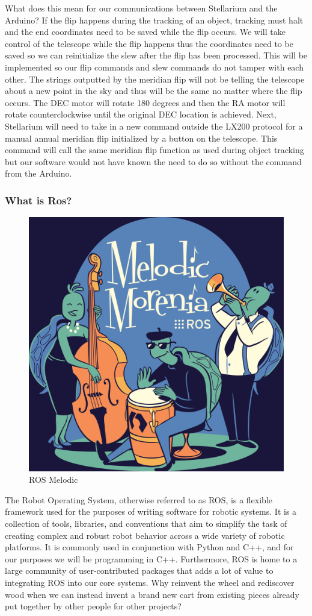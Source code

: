 \documentclass[12pt]{report}
\begin{document}
What does this mean for our communications between Stellarium and the Arduino? If the flip happens during the tracking of an object, tracking must halt and the end coordinates need to be saved while the flip occurs. We will take control of the telescope while the flip happens thus the coordinates need to be saved so we can reinitialize the slew after the flip has been processed. This will be implemented so our flip commands and slew commands do not tamper with each other. The strings outputted by the meridian flip will not be telling the telescope about a new point in the sky and thus will be the same no matter where the flip occurs. The DEC motor will rotate 180 degrees and then the RA motor will rotate counterclockwise until the original DEC location is achieved. Next, Stellarium will need to take in a new command outside the LX200 protocol for a manual annual meridian flip initialized by a button on the telescope. This command will call the same meridian flip function as used during object tracking but our software would not have known the need to do so without the command from the Arduino.


\subsubsection*{What is Ros?}

\begin{figure}[h]
	\centering
	\includegraphics[width=0.50\linewidth]{melodic}
	\caption{ROS Melodic}
\end{figure}

The Robot Operating System, otherwise referred to as ROS, is a flexible framework used for the purposes of writing software for robotic systems. It is a collection of tools, libraries, and conventions that aim to simplify the task of creating complex and robust robot behavior across a wide variety of robotic platforms.\cite{ROSDescription} It is commonly used in conjunction with Python and C++, and for our purposes we will be programming in C++. Furthermore, ROS is home to a large community of user-contributed packages that adds a lot of value to integrating ROS into our core systems. Why reinvent the wheel and rediscover wood when we can instead invent a brand new cart from existing pieces already put together by other people for other projects?
\end{document}
